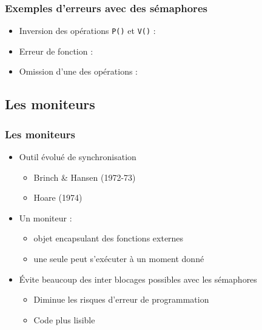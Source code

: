 \begin{frame}
\frametitle{Exemples d’erreurs avec des sémaphores}
\begin{itemize}
\item <1-> Inversion des opérations \texttt{P()} et \texttt{V()} :\\
\begin{scriptsize}

\end{scriptsize}
\item <2-> Erreur de fonction :\\
\begin{scriptsize}

\end{scriptsize}
\item <3-> Omission d’une des opérations :\\
\begin{scriptsize}

\end{scriptsize}
\end{itemize}
\end{frame}
\subsection{Les moniteurs}

\begin{frame}
\frametitle{Les moniteurs}
\begin{itemize}
\item <1-> Outil évolué de synchronisation
\begin{itemize}
\item Brinch \& Hansen (1972-73)
\item Hoare (1974)
\end{itemize}
\item <2-> Un moniteur :
\begin{itemize}
\item objet encapsulant des fonctions externes
\item une seule peut s’exécuter à un moment donné
\end{itemize}
\item <3-> Évite beaucoup des inter blocages possibles avec les sémaphores
\begin{itemize}
\item Diminue les risques d'erreur de programmation
\item Code plus lisible
\end{itemize}
\end{itemize}
\end{frame}

